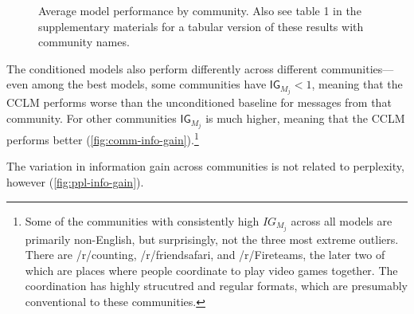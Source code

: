 \documentclass[11pt]{article}
\newcommand\Ppl{\mathsf{Ppl}}
\newcommand\IG{\mathsf{IG}}
\begin{document}
\newcommand{\modelboxplot}[3]{
  \addplot+[
    boxplot={draw position=#3, box extend=0.3}, 
    draw=#2, mark=*, mark options={fill=#2, scale=0.5}, solid, fill=#2!10,
    area legend] 
    table [y=#1] {floats/comm.csv};
}
\begin{figure}[t]
\caption{
   Average model performance by community. 
   Also see table 1 in the supplementary materials
   for a tabular version of these results with community names.
}
\label{fig:comm-stratified-box}
\end{figure}

The conditioned models also perform differently across different communities---%
even among the best models, some communities have $\IG_{M_j} < 1$,
meaning that the CCLM performs worse than the unconditioned baseline for 
messages from that community.
For other communities $\IG_{M_j}$ is much higher, meaning that the CCLM performs better  
(\cref{fig:comm-info-gain}).\footnote{
  Some of the communities with consistently high $IG_{M_j}$ 
  across all models are primarily non-English, 
  but surprisingly, not the three most extreme
  outliers. There are /r/counting, /r/friendsafari, and /r/Fireteams, 
  the later two of which are places where people coordinate to play video games
  together. The coordination has highly strucutred and regular formats, which 
  are presumably conventional to these communities.}

The variation in information gain across communities is not 
related to perplexity, however (\cref{fig:ppl-info-gain}).
\end{document}
